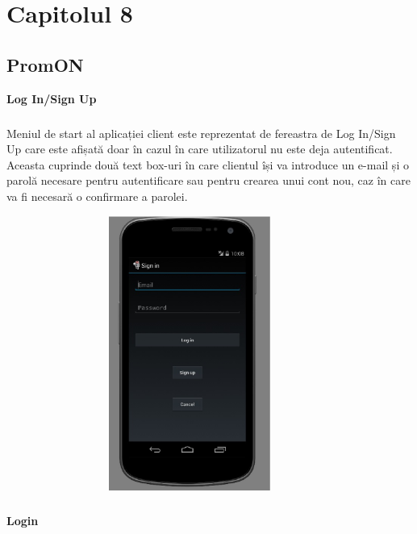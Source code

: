 \chapter{Capitolul 8}
\section{PromON}
\textbf{Log In/Sign Up}
\paragraph{ }Meniul de start al aplicației client este reprezentat de fereastra de Log In/Sign Up care este afișată doar în cazul în care utilizatorul nu este deja autentificat. Aceasta cuprinde două text box-uri în care clientul își va introduce un e-mail și o parolă necesare pentru autentificare sau pentru crearea unui cont nou, caz în care va fi necesară o confirmare a parolei.

\begin{center}
\includegraphics[width=12cm,height=9cm,keepaspectratio]{imagini/login.eps} %
\paragraph{}
\textbf{Login}
\end{center}

